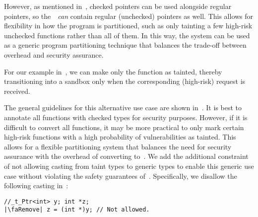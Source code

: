 However, as mentioned in~, checked pointers can be used alongside regular pointers, so the~\cregion{}~\emph{can} contain regular (unchecked) pointers as well.
%
This allows for flexibility in how the program is partitioned, such as only tainting a few high-risk unchecked functions rather than all of them. In this way, the system can be used as a generic program partitioning technique that balances the trade-off between overhead and security assurance.

For our example in~, we can make only the function  as tainted, thereby transitioning into a sandbox only when the corresponding (high-risk) request is received.

The general guidelines for this alternative use case are shown in~.
It is best to annotate all functions with checked types for security purposes. However, if it is difficult to convert all functions, it may be more practical to only mark certain high-risk functions with a high probability of vulnerabilities as tainted. This allows for a flexible partitioning system that balances the need for security assurance with the overhead of converting to~\checkedc.
We add the additional constraint of not allowing casting from taint types to generic types to enable this generic use case without violating the safety guarantees of~\systemname.
Specifically, we disallow the following casting in~\cregion:
\begin{verbatim}
//_t_Ptr<int> y; int *z;
|\faRemove| z = (int *)y; // Not allowed.
\end{verbatim}
\iffalse

